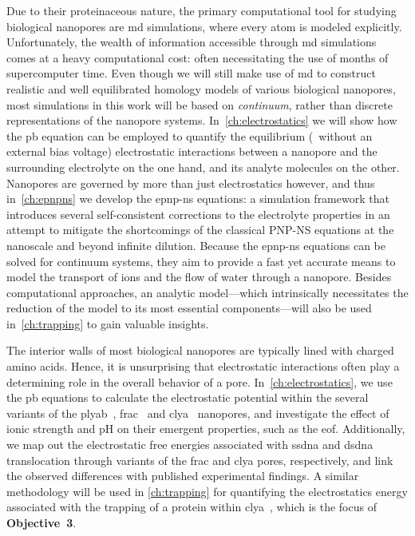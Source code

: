 Due to their proteinaceous nature, the primary computational tool for studying biological nanopores are
\gls{md} simulations, where every atom is modeled explicitly. Unfortunately, the wealth of information
accessible through \gls{md} simulations comes at a heavy computational cost: often necessitating the use of
months of supercomputer time. Even though we will still make use of \gls{md} to construct realistic and well
equilibrated homology models of various biological nanopores, most simulations in this work will be based on
\emph{continuum}, rather than discrete representations of the nanopore systems. In~\cref{ch:electrostatics} we
will show how the \gls{pb} equation can be employed to quantify the equilibrium (\ie~without an external bias
voltage) electrostatic interactions between a nanopore and the surrounding electrolyte on the one hand, and
its analyte molecules on the other. Nanopores are governed by more than just electrostatics however, and thus
in~\cref{ch:epnpns} we develop the \gls{epnp-ns} equations: a simulation framework that introduces several
self-consistent corrections to the electrolyte properties in an attempt to mitigate the shortcomings of the
classical {PNP-NS} equations at the nanoscale and beyond infinite dilution. Because the \gls{epnp-ns}
equations can be solved for continuum systems, they aim to provide a fast yet accurate means to model the
transport of ions and the flow of water through a nanopore. Besides computational approaches, an analytic
model---which intrinsically necessitates the reduction of the model to its most essential components---will
also be used in~\cref{ch:trapping} to gain valuable insights.

%
%

The interior walls of most biological nanopores are typically lined with charged amino acids. Hence, it is
unsurprising that electrostatic interactions often play a determining role in the overall behavior of a pore.
In~\cref{ch:electrostatics}, we use the \gls{pb} equations to calculate the electrostatic potential within the
several variants of the \gls{plyab}~\cite{Huang-2020}, \gls{frac}~\cite{Wloka-2016,Huang-2017} and
\gls{clya}~\cite{Franceschini-2016} nanopores, and investigate the effect of ionic strength and pH on their
emergent properties, such as the \gls{eof}. Additionally, we map out the electrostatic free energies
associated with \gls{ssdna} and \gls{dsdna} translocation through variants of the \gls{frac} and \gls{clya}
pores, respectively, and link the observed differences with published experimental findings. A similar
methodology will be used in \cref{ch:trapping} for quantifying the electrostatics energy associated with the
trapping of a protein within \gls{clya}~\cite{Soskine-Biesemans-2015}, which is the focus of
\textbf{Objective~3}.

